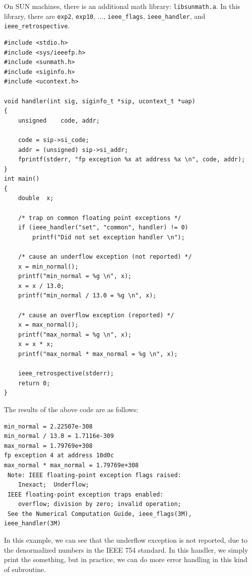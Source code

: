 
On SUN machines, there is an additional math
library: \texttt{libsunmath.a}. In this library, there are \texttt{exp2}, \texttt{exp10}, ..., \texttt{ieee\_flags}, \texttt{ieee\_handler}, and \texttt{ieee\_retrospective}.

\begin{verbatim}
#include <stdio.h>  
#include <sys/ieeefp.h>  
#include <sunmath.h>  
#include <siginfo.h>  
#include <ucontext.h>  

void handler(int sig, siginfo_t *sip, ucontext_t *uap)  
{  
    unsigned    code, addr;  

    code = sip->si_code;  
    addr = (unsigned) sip->si_addr;  
    fprintf(stderr, "fp exception %x at address %x \n", code, addr); 
}  
int main()  
{  
    double  x;  
  
    /* trap on common floating point exceptions */  
    if (ieee_handler("set", "common", handler) != 0)  
        printf("Did not set exception handler \n");  
  
    /* cause an underflow exception (not reported) */  
    x = min_normal();  
    printf("min_normal = %g \n", x);  
    x = x / 13.0;  
    printf("min_normal / 13.0 = %g \n", x);  
  
    /* cause an overflow exception (reported) */  
    x = max_normal();  
    printf("max_normal = %g \n", x);  
    x = x * x;  
    printf("max_normal * max_normal = %g \n", x);  
  
    ieee_retrospective(stderr);  
    return 0;  
}
\end{verbatim}

The results of the above code are as follows:

\begin{verbatim}
min_normal = 2.22507e-308  
min_normal / 13.0 = 1.7116e-309  
max_normal = 1.79769e+308  
fp exception 4 at address 10d0c  
max_normal * max_normal = 1.79769e+308  
 Note: IEEE floating-point exception flags raised:  
    Inexact;  Underflow;  
 IEEE floating-point exception traps enabled:  
    overflow; division by zero; invalid operation;  
 See the Numerical Computation Guide, ieee_flags(3M),  ieee_handler(3M)    
\end{verbatim}

In this example, we can see that the underflow exception is not reported, due to the denormalized numbers in the IEEE 754 standard. In this handler, we simply print the something, but in practice, we can do more error handling in this kind of subroutine.

